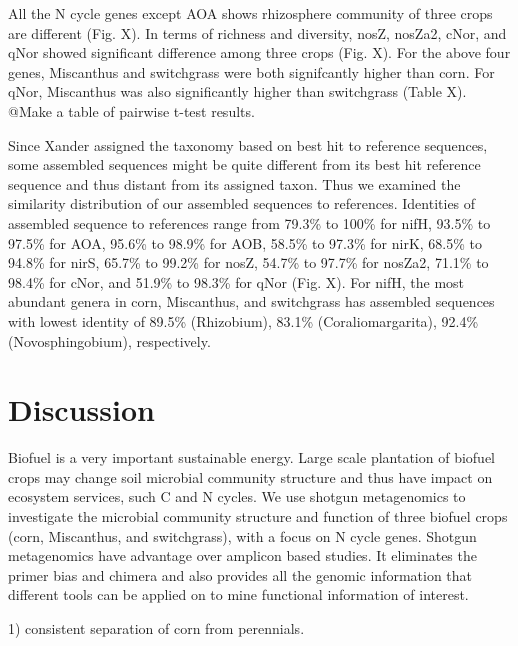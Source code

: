\documentclass[12pt]{article}
\begin{document}


All the N cycle genes except AOA shows rhizosphere community of three crops are different (Fig. X). In terms of richness and diversity, nosZ, nosZa2, cNor, and qNor showed significant difference among three crops (Fig. X). For the above four genes, Miscanthus and switchgrass were both signifcantly higher than corn. For qNor, Miscanthus was also significantly higher than switchgrass (Table X). @Make a table of pairwise t-test results.

Since Xander assigned the taxonomy based on best hit to reference sequences, some assembled sequences might be quite different from its best hit reference sequence and thus distant from its assigned taxon. Thus we examined the similarity distribution of our assembled sequences to references. Identities of assembled sequence to references range from 79.3\% to 100\% for nifH, 93.5\% to 97.5\% for AOA, 95.6\% to 98.9\% for AOB, 58.5\% to 97.3\% for nirK, 68.5\% to 94.8\% for nirS, 65.7\% to 99.2\% for nosZ, 54.7\% to 97.7\% for nosZa2, 71.1\% to 98.4\% for cNor, and 51.9\% to 98.3\% for qNor (Fig. X). For nifH, the most abundant genera in corn, Miscanthus, and switchgrass has assembled sequences with lowest identity of 89.5\% (Rhizobium), 83.1\% (Coraliomargarita), 92.4\% (Novosphingobium), respectively.



\section{Discussion}

Biofuel is a very important sustainable energy. Large scale plantation of biofuel crops may change soil microbial community structure and thus have impact on ecosystem services, such C and N cycles. We use shotgun metagenomics to investigate the microbial community structure and function of three biofuel crops (corn, Miscanthus, and switchgrass), with a focus on N cycle genes. Shotgun metagenomics have advantage over amplicon based studies. It eliminates the primer bias and chimera and also provides all the genomic information that different tools can be applied on to mine functional information of interest.

1) consistent separation of corn from perennials.
\end{document}
